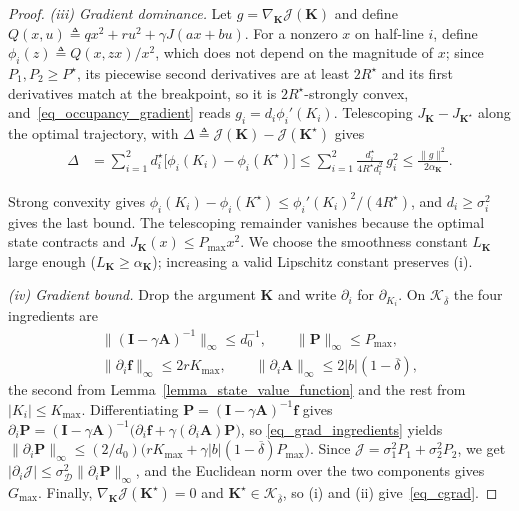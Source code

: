 \documentclass[10pt,a4paper]{amsart}
\newcommand{\Lemm}{Lemma}
\newcommand{\bA}{\mathbf{A}}
\newcommand{\bI}{\mathbf{I}}
\newcommand{\bK}{\mathbf{K}}
\newcommand{\bP}{\mathbf{P}}
\newcommand{\cD}{\mathcal{D}}
\newcommand{\cJ}{\mathcal{J}}
\newcommand{\cK}{\mathcal{K}}
\newcommand{\mbf}{\mathbf{f}}
\begin{document}
\begin{proof}
\emph{(iii) Gradient dominance.} Let $g=\nabla_{\bK}\cJ(\bK)$ and define $Q(x,u) \triangleq qx^{2}+ru^{2}+\gamma J(ax+bu)$. For a nonzero $x$ on half-line $i$, define $\phi_i(z)\triangleq Q(x,zx)/x^2$, which does not depend on the magnitude of $x$; since $P_1, P_2\ge P^{\star}$, its piecewise second derivatives are at least $2R^{\star}$ and its first derivatives match at the breakpoint, so it is $2R^{\star}$-strongly convex, and~\eqref{eq_occupancy_gradient} reads $g_i=d_i\phi_i'(K_i)$. Telescoping $J_{\bK}-J_{\bK^{\star}}$ along the optimal trajectory, with $ \Delta\triangleq\cJ(\bK)-\cJ(\bK^{\star})$ gives
\begin{equation}
    \begin{aligned}
    \Delta&=\sum_{i=1}^2 d_i^{\star}\bigl[\phi_i(K_i)-\phi_i(K^{\star})\bigr] \le\sum_{i=1}^2\frac{d_i^{\star}}{4R^{\star}d_i^2}\,g_i^2
       \le\frac{\|g\|^2}{2\alpha_{\bK}}.
    \end{aligned}
\end{equation}

Strong convexity gives $\phi_i(K_i) -\phi_i(K^{\star}) \le \phi_i'(K_i)^2 / (4R^{\star})$, and $d_i\ge\sigma_i^2$ gives the last bound. The telescoping remainder vanishes because the optimal state contracts and $J_{\bK}(x)\le P_{\max}x^2$.  We choose the smoothness constant $L_{\bK}$ large enough ($L_{\bK}\ge\alpha_{\bK}$); increasing a valid Lipschitz constant preserves (i).

\emph{(iv) Gradient bound.} Drop the argument $\bK$ and write $\partial_{i}$ for $\partial_{K_{i}}$. On $\cK_{\overline{\delta}}$ the four ingredients are
\begin{equation} \label{eq_grad_ingredients}
    \begin{gathered}
    \|(\bI{-}\gamma\bA)^{-1}\|_{\infty} \le d_{0}^{-1},
    \qquad
    \|\bP\|_{\infty} \le P_{\max},
    \\
    \|\partial_{i}\mbf\|_{\infty} \le 2rK_{\max},
    \qquad
    \|\partial_{i}\bA\|_{\infty} \le 2|b|(1{-}\overline{\delta}),
    \end{gathered}
\end{equation}
the second from \Lemm~\ref{lemma_state_value_function} and the rest from $|K_{i}| \le K_{\max}$. Differentiating $\bP = (\bI{-}\gamma\bA)^{-1}\mbf$ gives $\partial_{i}\bP = (\bI{-}\gamma\bA)^{-1}\bigl(\partial_{i}\mbf + \gamma(\partial_{i}\bA)\bP\bigr)$, so \eqref{eq_grad_ingredients} yields $\|\partial_{i}\bP\|_{\infty} \le (2/d_{0})\bigl(rK_{\max} + \gamma|b|(1{-}\overline{\delta})P_{\max}\bigr)$. Since $\cJ = \sigma_{1}^{2}P_{1} + \sigma_{2}^{2}P_{2}$, we get $|\partial_{i}\cJ| \le \sigma_{\cD}^{2}\|\partial_{i}\bP\|_{\infty}$, and the Euclidean norm over the two components gives $G_{\max}$. Finally, $\nabla_{\bK}\cJ(\bK^{\star}) {=} 0$ and $\bK^{\star}{\in} \cK_{\overline{\delta}}$, so (i) and (ii) give~\eqref{eq_cgrad}.
\end{proof}
\end{document}

